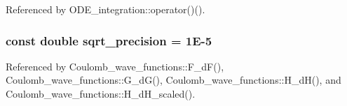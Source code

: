 Referenced by O\-D\-E\-\_\-integration\-::operator()().

\hypertarget{complex__functions_8H_acee010e7dc0752836d30a2b57075f57b}{
\subsubsection[{sqrt\-\_\-precision}]{\setlength{\rightskip}{0pt plus 5cm}const double sqrt\-\_\-precision = 1\-E-\/5}}\label{complex__functions_8H_acee010e7dc0752836d30a2b57075f57b}


Referenced by Coulomb\-\_\-wave\-\_\-functions\-::\-F\-\_\-d\-F(), Coulomb\-\_\-wave\-\_\-functions\-::\-G\-\_\-d\-G(), Coulomb\-\_\-wave\-\_\-functions\-::\-H\-\_\-d\-H(), and Coulomb\-\_\-wave\-\_\-functions\-::\-H\-\_\-d\-H\-\_\-scaled().

